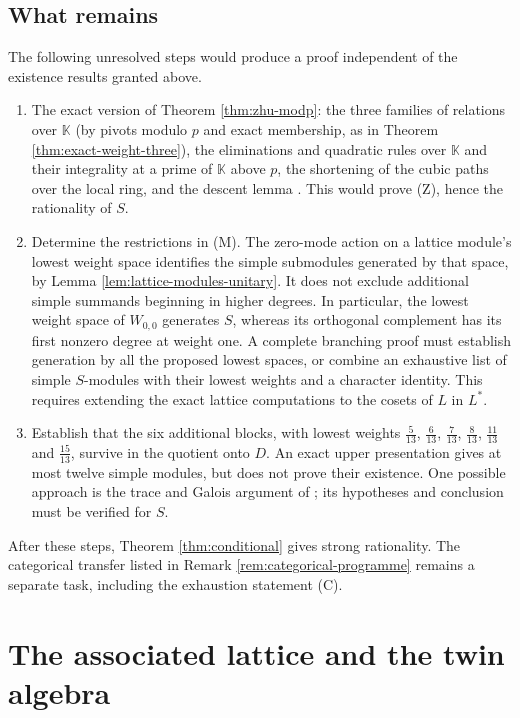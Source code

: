 \documentclass[leqno]{article}
\newcommand{\K}{\ensuremath{\mathbb{K}}}
\numberwithin{equation}{section}
\begin{document}
\subsection{What remains}
\label{subsec:what-remains}

The following unresolved steps would produce a proof independent of the existence results granted above.
\begin{enumerate}
\item The exact version of Theorem \ref{thm:zhu-modp}: the three families of relations over $\K$ (by pivots modulo $p$ and exact membership, as in Theorem \ref{thm:exact-weight-three}), the eliminations and quadratic rules over $\K$ and their integrality at a prime of $\K$ above $p$, the shortening of the cubic paths over the local ring, and the descent lemma \cite[Lemma 9.6]{Rie26b}. This would prove (Z), hence the rationality of $S$.
\item Determine the restrictions in (M). The zero-mode action on a lattice module's lowest weight space identifies the simple submodules generated by that space, by Lemma \ref{lem:lattice-modules-unitary}. It does not exclude additional simple summands beginning in higher degrees. In particular, the lowest weight space of $W_{0,0}$ generates $S$, whereas its orthogonal complement has its first nonzero degree at weight one. A complete branching proof must establish generation by all the proposed lowest spaces, or combine an exhaustive list of simple $S$-modules with their lowest weights and a character identity. This requires extending the exact lattice computations to the cosets of $L$ in $L^*$.
\item Establish that the six additional blocks, with lowest weights $\frac{5}{13}$, $\frac{6}{13}$, $\frac{7}{13}$, $\frac{8}{13}$, $\frac{11}{13}$ and $\frac{15}{13}$, survive in the quotient onto $D$. An exact upper presentation gives at most twelve simple modules, but does not prove their existence. One possible approach is the trace and Galois argument of \cite[Section 11]{Rie26b}; its hypotheses and conclusion must be verified for $S$.
\end{enumerate}
After these steps, Theorem \ref{thm:conditional} gives strong rationality. The categorical transfer listed in Remark \ref{rem:categorical-programme} remains a separate task, including the exhaustion statement (C).

\section{The associated lattice and the twin algebra}
\label{sec:genus}
\end{document}
